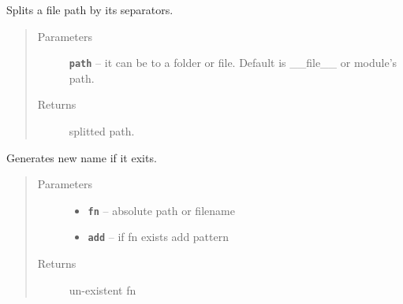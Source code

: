 \documentclass[letterpaper,10pt,english]{sphinxmanual}
\begin{document}

\begin{fulllineitems}
\label{RRtoolbox.lib:RRtoolbox.lib.directory.getSplitted}
Splits a file path by its separators.
\begin{quote}\begin{description}
\item[{Parameters}] \leavevmode
\textbf{\texttt{path}} -- it can be to a folder or file. Default is \_\_file\_\_ or module's path.

\item[{Returns}] \leavevmode
splitted path.

\end{description}\end{quote}

\end{fulllineitems}


\begin{fulllineitems}
\label{RRtoolbox.lib:RRtoolbox.lib.directory.increment_if_exits}
Generates new name if it exits.
\begin{quote}\begin{description}
\item[{Parameters}] \leavevmode\begin{itemize}
\item {} 
\textbf{\texttt{fn}} -- absolute path or filename

\item {} 
\textbf{\texttt{add}} -- if fn exists add pattern

\end{itemize}

\item[{Returns}] \leavevmode
un-existent fn

\end{description}\end{quote}

\end{fulllineitems}

\end{document}
